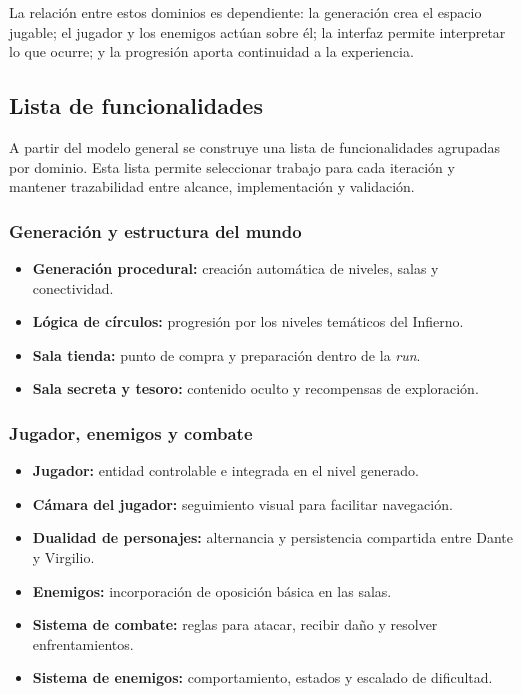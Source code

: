 La relación entre estos dominios es dependiente: la generación crea el espacio jugable; el
jugador y los enemigos actúan sobre él; la interfaz permite interpretar lo que ocurre; y la
progresión aporta continuidad a la experiencia.

\subsection{Lista de funcionalidades}
A partir del modelo general se construye una lista de funcionalidades agrupadas por dominio.
Esta lista permite seleccionar trabajo para cada iteración y mantener trazabilidad entre
alcance, implementación y validación.

\subsubsection{Generación y estructura del mundo}
\begin{itemize}
    \item \textbf{Generación procedural:} creación automática de niveles, salas y
    conectividad.
    \item \textbf{Lógica de círculos:} progresión por los niveles temáticos del Infierno.
    \item \textbf{Sala tienda:} punto de compra y preparación dentro de la \textit{run}.
    \item \textbf{Sala secreta y tesoro:} contenido oculto y recompensas de exploración.
\end{itemize}

\subsubsection{Jugador, enemigos y combate}
\begin{itemize}
    \item \textbf{Jugador:} entidad controlable e integrada en el nivel generado.
    \item \textbf{Cámara del jugador:} seguimiento visual para facilitar navegación.
    \item \textbf{Dualidad de personajes:} alternancia y persistencia compartida entre
    Dante y Virgilio.
    \item \textbf{Enemigos:} incorporación de oposición básica en las salas.
    \item \textbf{Sistema de combate:} reglas para atacar, recibir daño y resolver
    enfrentamientos.
    \item \textbf{Sistema de enemigos:} comportamiento, estados y escalado de dificultad.
\end{itemize}

